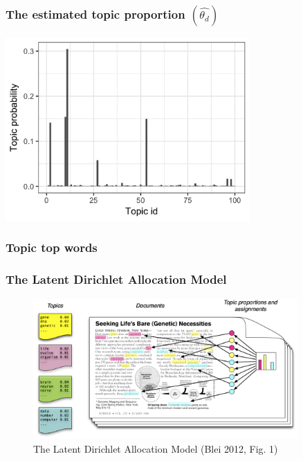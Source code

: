 \documentclass[10pt]{beamer}
\begin{document}
\begin{frame}
\frametitle{The estimated topic proportion $(\hat{\theta_d})$}

\begin{center}
\includegraphics[width=0.7\textwidth]{fig/topic_prop.png}
\end{center}

\end{frame}

\begin{frame}
\frametitle{Topic top words}



\end{frame}

\begin{frame}
\frametitle{The Latent Dirichlet Allocation Model}

\begin{figure}[h]
\begin{center}
\includegraphics[width=0.9\textwidth]{fig/Blei2012_fig_1.png}
\caption{The Latent Dirichlet Allocation Model (Blei 2012, Fig. 1)}
\end{center}
\end{figure}

\end{frame}
\end{document}
